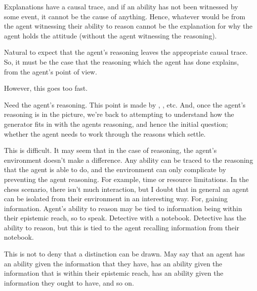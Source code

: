 \documentclass[10pt]{article}
\begin{document}
\begin{note}
  Explanations have a causal trace, and if an ability has not been witnessed by some event, it cannot be the cause of anything.
  Hence, whatever would be from the agent witnessing their ability to reason cannot be the explanation for why the agent holds the attitude (without the agent witnessing the reasoning).

  Natural to expect that the agent's reasoning leaves the appropriate causal trace.
  So, it must be the case that the reasoning which the agent has done explains, from the agent's point of view.

  However, this goes too fast.

  Need the agent's reasoning.
  This point is made by \citeauthor[233]{Davidson:2001aa}, \citeauthor{Hieronymi:2018aa}, etc.
  And, once the agent's reasoning is in the picture, we're back to attempting to understand how the generator fits in with the agents reasoning, and hence the initial question; whether the agent needs to work through the reasons which settle.
\end{note}


\begin{note}
  This is difficult.
  It may seem that in the case of reasoning, the agent's environment doesn't make a difference.
  Any ability can be traced to the reasoning that the agent is able to do, and the environment can only complicate by preventing the agent reasoning.
  For example, time or resource limitations.
  In the chess scenario, there isn't much interaction, but I doubt that in general an agent can be isolated from their environment in an interesting way.
  For, gaining information.
  Agent's ability to reason may be tied to information being within their epistemic reach, so to speak.
  Detective with a notebook.
  Detective has the ability to reason, but this is tied to the agent recalling information from their notebook.

  This is not to deny that a distinction can be drawn.
  May say that an agent has an ability given the information that they have, has an ability given the information that is within their epistemic reach, has an ability given the information they ought to have, and so on.
\end{note}
\end{document}
